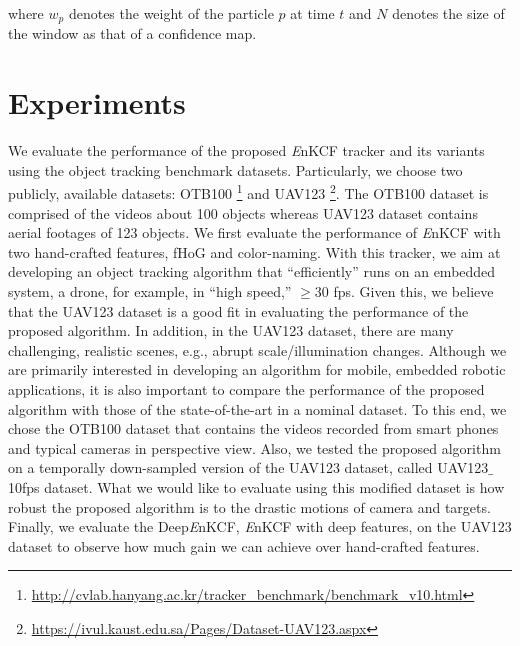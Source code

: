\documentclass[10pt,twocolumn,letterpaper]{article}
\begin{document}
where $w_{p}$ denotes the weight of the particle $p$ at time $t$ and $N$ denotes the
size of the window as that of a confidence map. 

\section{Experiments} \label{sc:Experiments}
We evaluate the performance of the proposed {\it E}nKCF tracker and
its variants using the object tracking benchmark
datasets. Particularly, we choose two publicly, available datasets:
OTB100 \footnote{\url{http://cvlab.hanyang.ac.kr/tracker_benchmark/benchmark_v10.html}}
and
UAV123 \footnote{\url{https://ivul.kaust.edu.sa/Pages/Dataset-UAV123.aspx}}\cite{mueller2016uav123}.
The OTB100 dataset is comprised of the videos about 100 objects
whereas UAV123 dataset contains aerial footages of 123 objects.  We
first evaluate the performance of {\it E}nKCF with two hand-crafted
features, fHoG and color-naming.  With this tracker, we aim at
developing an object tracking algorithm that ``efficiently'' runs on
an embedded system, a drone, for example, in ``high speed,'' $\ge 30$
fps. Given this, we believe that the UAV123 dataset is a good fit in
evaluating the performance of the proposed algorithm. In addition, in
the UAV123 dataset, there are many challenging, realistic scenes,
e.g., abrupt scale/illumination changes. Although we are primarily
interested in developing an algorithm for mobile, embedded robotic
applications, it is also important to compare the performance of the
proposed algorithm with those of the state-of-the-art in a nominal
dataset. To this end, we chose the OTB100 dataset that
contains the videos recorded from smart phones and typical cameras in
perspective view. Also, we tested the proposed algorithm on a
temporally down-sampled version of the UAV123 dataset, called
UAV123$\_$10fps dataset. What we would like to evaluate using this
modified dataset is how robust the proposed algorithm is to the
drastic motions of camera and targets. Finally, we evaluate the
Deep{\it E}nKCF, {\it E}nKCF with deep features, on the UAV123 dataset
to observe how much gain we can achieve over hand-crafted features.
\end{document}
